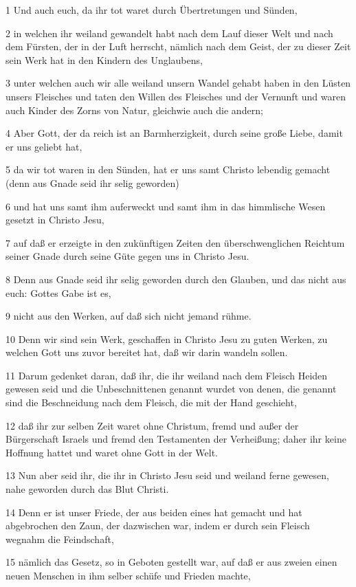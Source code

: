 \par 1 Und auch euch, da ihr tot waret durch Übertretungen und Sünden,
\par 2 in welchen ihr weiland gewandelt habt nach dem Lauf dieser Welt und nach dem Fürsten, der in der Luft herrscht, nämlich nach dem Geist, der zu dieser Zeit sein Werk hat in den Kindern des Unglaubens,
\par 3 unter welchen auch wir alle weiland unsern Wandel gehabt haben in den Lüsten unsers Fleisches und taten den Willen des Fleisches und der Vernunft und waren auch Kinder des Zorns von Natur, gleichwie auch die andern;
\par 4 Aber Gott, der da reich ist an Barmherzigkeit, durch seine große Liebe, damit er uns geliebt hat,
\par 5 da wir tot waren in den Sünden, hat er uns samt Christo lebendig gemacht (denn aus Gnade seid ihr selig geworden)
\par 6 und hat uns samt ihm auferweckt und samt ihm in das himmlische Wesen gesetzt in Christo Jesu,
\par 7 auf daß er erzeigte in den zukünftigen Zeiten den überschwenglichen Reichtum seiner Gnade durch seine Güte gegen uns in Christo Jesu.
\par 8 Denn aus Gnade seid ihr selig geworden durch den Glauben, und das nicht aus euch: Gottes Gabe ist es,
\par 9 nicht aus den Werken, auf daß sich nicht jemand rühme.
\par 10 Denn wir sind sein Werk, geschaffen in Christo Jesu zu guten Werken, zu welchen Gott uns zuvor bereitet hat, daß wir darin wandeln sollen.
\par 11 Darum gedenket daran, daß ihr, die ihr weiland nach dem Fleisch Heiden gewesen seid und die Unbeschnittenen genannt wurdet von denen, die genannt sind die Beschneidung nach dem Fleisch, die mit der Hand geschieht,
\par 12 daß ihr zur selben Zeit waret ohne Christum, fremd und außer der Bürgerschaft Israels und fremd den Testamenten der Verheißung; daher ihr keine Hoffnung hattet und waret ohne Gott in der Welt.
\par 13 Nun aber seid ihr, die ihr in Christo Jesu seid und weiland ferne gewesen, nahe geworden durch das Blut Christi.
\par 14 Denn er ist unser Friede, der aus beiden eines hat gemacht und hat abgebrochen den Zaun, der dazwischen war, indem er durch sein Fleisch wegnahm die Feindschaft,
\par 15 nämlich das Gesetz, so in Geboten gestellt war, auf daß er aus zweien einen neuen Menschen in ihm selber schüfe und Frieden machte,
